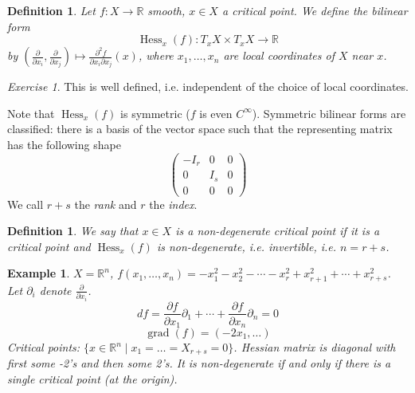 \documentclass[12pt]{article}
\theoremstyle{darkgreentheorem}
\theoremstyle{darkbluedefinition}
\newtheorem{defn}[thm]{Definition}
\theoremstyle{darkredexample}
\newtheorem{exa}[thm]{Example}
\theoremstyle{remark}
\newtheorem{exe}[thm]{Exercise}
\newcommand{\R}{\mathbb{R}}
\newcommand{\1}{\mathbbm{1}}
\DeclareMathOperator{\Hess}{Hess}
\newcommand{\tms}{\times}
\begin{document}
\begin{defn}
    Let $f\colon X\to \R$ smooth, $x\in X$ a critical point.
    We define the bilinear form
    \[ \Hess_{x}(f)\colon T_{x}X\tms T_{x}X\to \R \]
    by $\left(\frac{\partial}{\partial x_{i}},\frac{\partial}{\partial x_{j}}\right)\mapsto \frac{\partial^{2} f}{\partial x_{i}\partial x_{j}}(x) $, where $x_{1},\ldots,x_{n}$ are local coordinates of $X$ near $x$.
\end{defn}

\begin{exe}
    This is well defined, i.e. independent of the choice of local coordinates.
\end{exe}

Note that $\Hess_{x}(f)$ is symmetric ($f$ is even $C^{\infty}$).
Symmetric bilinear forms are classified: there is a basis of the vector space such that the representing matrix has the following shape
\[ \begin{pmatrix} -I_{r} & 0 & 0 \\ 0 & I_{s} & 0 \\ 0 & 0 & 0\end{pmatrix} \]
We call $r+s$ the \textit{rank} and $r$ the \textit{index}.

\begin{defn}
    We say that $x\in X$ is a \textit{non-degenerate} critical point if it is a critical point and $\Hess_{x}(f)$ is non-degenerate, i.e. invertible, i.e. $n=r+s$.
\end{defn}

\begin{exa}
    $X=\R^{n}$, $f(x_{1},\ldots,x_{n})=-x_{1}^{2}-x_{2}^{2}-\cdots -x_{r}^{2} + x_{r+1}^{2}+\cdots +x_{r+s}^{2}$.
    Let $\partial_{i}$ denote $\frac{\partial}{\partial x_{i}}$.
    \[ df=\frac{\partial f}{\partial x_{1}}\partial_{1}+\cdots +\frac{\partial f}{\partial x_{n}}\partial_{n}=0 \]
    \[ \operatorname{grad}(f)=(-2x_{1},\ldots) \]
    Critical points: $\{ x\in \R^{n}\mid x_{1}=\ldots=X_{r+s}=0\}$.
    Hessian matrix is diagonal with first some -2's and then some 2's.
    It is non-degenerate if and only if there is a single critical point (at the origin).
\end{exa}
\end{document}
